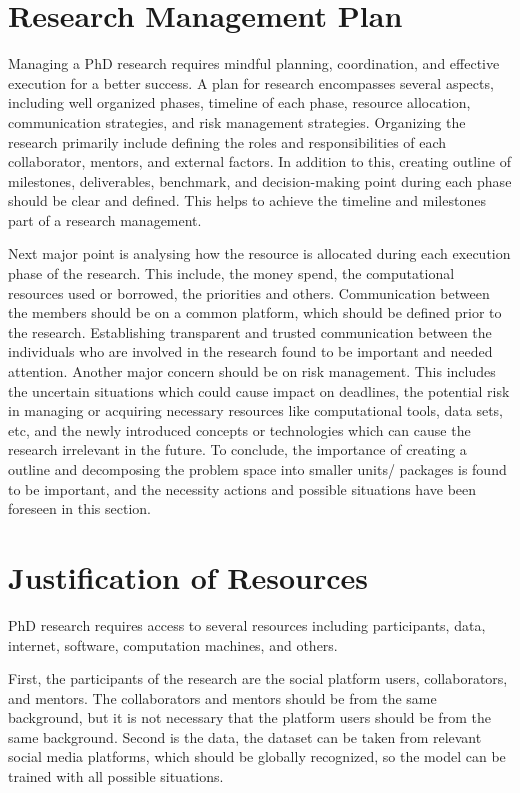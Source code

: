 \documentclass[a4paper,onecolumn,11pt]{article}
\begin{document}
\section{Research Management Plan}

	Managing a PhD research requires mindful planning, coordination, and effective execution for a better success. A plan for research encompasses several aspects, including well organized phases, timeline of each phase, resource allocation, communication strategies, and risk management strategies. Organizing the research primarily include defining the roles and responsibilities of each collaborator, mentors, and external factors.  In addition to this, creating outline of milestones, deliverables, benchmark, and decision-making point during each phase should be clear and defined. This helps to achieve the timeline and milestones part of a research management.
    
    Next major point is analysing how the resource is allocated during each execution phase of the research. This include, the money spend, the computational resources used or borrowed, the priorities and others. Communication between the members should be on a common platform, which should be defined prior to the research. Establishing transparent and trusted communication between the individuals who are involved in the research found to be important and needed attention. Another major concern should be on risk management. This includes the uncertain situations which could cause impact on deadlines, the potential risk in managing or acquiring necessary resources like computational tools, data sets, etc, and the newly introduced concepts or technologies which can cause the research irrelevant in the future.
	To conclude, the importance of creating a outline and decomposing the problem space into smaller units/ packages is found to be important, and the necessity actions and possible situations have been foreseen in this section.


\section{Justification of Resources}
	PhD research requires access to several resources including participants, data, internet, software, computation machines, and others. 
    
    First, the participants of the research are the social platform users, collaborators, and mentors. The collaborators and mentors should be from the same background, but it is not necessary that the platform users should be from the same background. Second is the data,  the dataset can be taken from relevant social media platforms, which should be globally recognized, so the model can be trained with all possible situations. 
    
\end{document}
